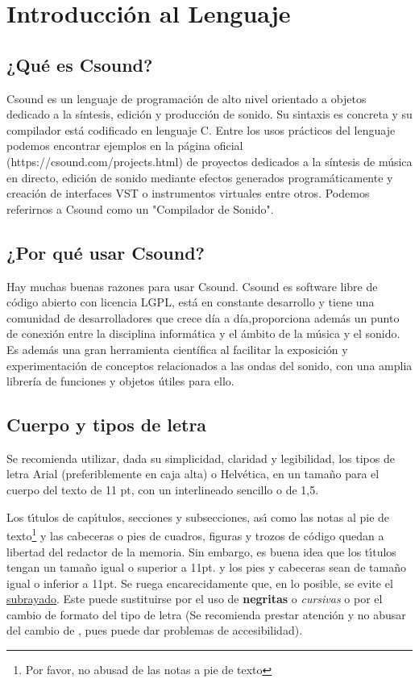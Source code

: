 
\chapter{Introducción al Lenguaje}\label{cap1}
\section{¿Qué es Csound?}\label{sec:intro}

Csound es un lenguaje de programación de alto nivel orientado a objetos dedicado a la síntesis, edición y producción de sonido. Su sintaxis es concreta y su compilador está codificado en lenguaje C. Entre los usos prácticos del lenguaje podemos encontrar ejemplos en la página oficial (https://csound.com/projects.html) de proyectos dedicados a la síntesis de música en directo, edición de sonido mediante efectos generados programáticamente y creación de interfaces VST o instrumentos virtuales entre otros.
Podemos referirnos a Csound como un "Compilador de Sonido".


\section{¿Por qué usar Csound?}\label{sec:intro}

Hay muchas buenas razones para usar Csound. Csound es software libre de código abierto con licencia LGPL, está en constante desarrollo y tiene una comunidad de desarrolladores que crece día a día,proporciona además un punto de conexión entre la disciplina informática y el ámbito de la música y el sonido. 
Es además una gran herramienta científica al facilitar la exposición y experimentación de conceptos relacionados a las ondas del sonido, con una amplia librería de funciones y objetos útiles para ello. 


\section{Cuerpo y tipos de letra}\label{sec:letra}

Se recomienda utilizar, dada su simplicidad, claridad y legibilidad, los tipos de letra
Arial (preferiblemente en caja alta) o Helv\'etica, en un tamaño para el cuerpo del texto de 11 pt,
con un interlineado sencillo o de 1,5.

Los t{\'\i}tulos de cap{\'\i}tulos, secciones y subsecciones, as{\'\i} como las notas al pie de texto\footnote{Por favor, no abusad de las notas a pie de texto}
y las cabeceras o pies de cuadros, figuras y trozos de c\'odigo quedan a libertad del redactor de la memoria.
Sin embargo, es buena idea que los t{\'\i}tulos tengan un tamaño igual o superior a 11pt. y los pies y cabeceras
sean de tama{\~n}o igual o inferior a 11pt. Se ruega encarecidamente que, en lo posible, se evite el \underline{subrayado}.
Este puede sustituirse por el uso de \textbf{negritas} o \textit{cursivas} o por el cambio de formato del tipo de letra
(Se recomienda prestar atenci\'on y no abusar del cambio de {\color{blue}{color}}, 
pues puede dar problemas de accesibilidad).

